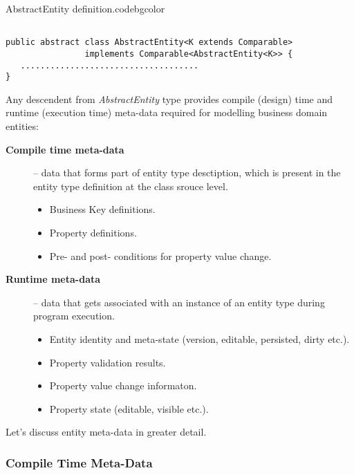   \begin{code}{AbstractEntity definition.}{\label{lst:AbstractEntity}}{codebgcolor}
    \begin{lstlisting}

public abstract class AbstractEntity<K extends Comparable> 
                implements Comparable<AbstractEntity<K>> {
   ....................................
}
    \end{lstlisting}
  \end{code}


  Any descendent from \emph{AbstractEntity} type provides compile (design) time and runtime (execution time) meta-data required for modelling business domain entities:
  \begin{description}
   \item[\textbf{Compile time meta-data}] -- data that forms part of entity type desctiption, which is present in the entity type definition at the class srouce level.
      \begin{itemize}
	\item Business Key definitions.
	\item Property definitions.
	\item Pre- and post- conditions for property value change.
      \end{itemize}

   \item[\textbf{Runtime meta-data}] -- data that gets associated with an instance of an entity type during program execution.
      \begin{itemize}
	\item Entity identity and meta-state (version, editable, persisted, dirty etc.).
	\item Property validation results.
	\item Property value change informaton.
	\item Property state (editable, visible etc.).	
      \end{itemize}
   \end{description}

  Let's discuss entity meta-data in greater detail.

\subsubsection{Compile Time Meta-Data}
  
